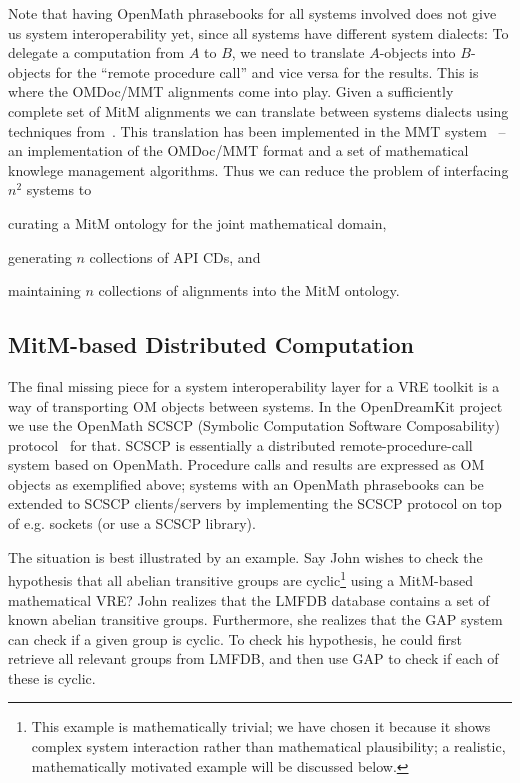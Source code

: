 Note that having OpenMath phrasebooks for all systems involved does not give us system interoperability yet, since all systems have different system dialects: 
To delegate a computation from $A$ to $B$, we need to translate $A$-objects into $B$-objects for the ``remote procedure call'' and vice versa for the results. This is where the OMDoc/MMT alignments come into play. 
Given a sufficiently complete set of MitM alignments we can translate between systems dialects using techniques from~\cite{MueRoYuRa:abtafs17}. This translation has been implemented in the MMT system~\cite{Rabe:MAGMS13,uniformal:on}   -- an implementation of the OMDoc/MMT format and a set of mathematical knowlege management algorithms. 
Thus we can reduce the problem of  interfacing $n^2$ systems to
\begin{inparaenum}[\em i\rm)]
\item curating a MitM ontology for the joint mathematical domain,
\item generating $n$ collections of API CDs, and 
\item maintaining $n$ collections of alignments into the MitM ontology.
\end{inparaenum}

\subsection{MitM-based Distributed Computation}\label{sec:mitm:comms}

The final missing piece for a system interoperability layer for a VRE toolkit is a way of transporting OM objects between systems. 
In the OpenDreamKit project we use the OpenMath SCSCP (Symbolic Computation Software Composability) protocol~\cite{SCSCP-1.3} for that. 
SCSCP is essentially a distributed remote-procedure-call system based on OpenMath. 
Procedure calls and results are expressed as OM objects as exemplified above; systems with an OpenMath phrasebooks can be extended to  SCSCP clients/servers by implementing the SCSCP protocol on top of e.g. sockets (or use a SCSCP library). 

The situation is best illustrated by an example. Say John wishes to check the hypothesis that all abelian transitive groups are cyclic\footnote{This example is mathematically trivial; we have chosen it because it shows complex system interaction rather than mathematical plausibility; a realistic, mathematically motivated example will be discussed below.} using a MitM-based mathematical VRE?  
John realizes that the LMFDB database contains a set of known abelian transitive groups.
Furthermore, she realizes that the GAP system can check if a given group is cyclic. 
To check his hypothesis, he could first retrieve all relevant groups from LMFDB, and then use GAP to check if each of these is cyclic. 

